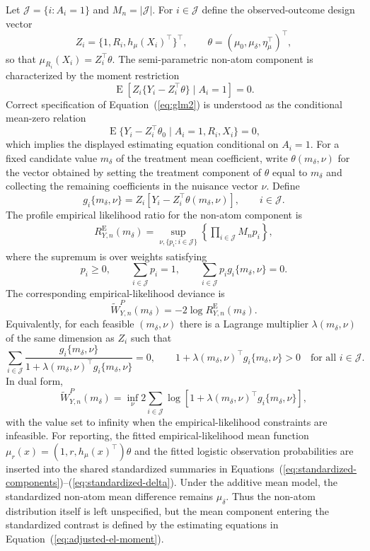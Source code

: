 \documentclass[11pt]{article}
\DeclareMathOperator*{\E}{E}
\begin{document}
Let $\mathcal{J} = \{i : A_i = 1\}$ and $M_n = |\mathcal{J}|$. For $i \in \mathcal{J}$ define the observed-outcome design vector
\[
  Z_i =
  \{1, R_i, h_\mu(X_i)^\top\}^\top,
  \qquad
  \theta =
  (\mu_0,\mu_\delta,\eta_\mu^\top)^\top,
\]
so that $\mu_{R_i}(X_i)=Z_i^\top\theta$. The semi-parametric non-atom component is characterized by the moment restriction
\begin{equation}
  \E\!\left[
    Z_i\{Y_i-Z_i^\top\theta\}
    \mid A_i = 1
  \right] = 0.
  \label{eq:adjusted-el-moment}
\end{equation}
Correct specification of Equation~(\ref{eq:glm2}) is understood as the conditional mean-zero relation
\[
  \E\{Y_i-Z_i^\top\theta_0\mid A_i=1,R_i,X_i\}=0,
\]
which implies the displayed estimating equation conditional on $A_i=1$.
For a fixed candidate value $m_\delta$ of the treatment mean coefficient, write $\theta(m_\delta,\nu)$ for the vector obtained by setting the treatment component of $\theta$ equal to $m_\delta$ and collecting the remaining coefficients in the nuisance vector $\nu$. Define
\[
  g_i\{m_\delta,\nu\}
  =
  Z_i\left[Y_i-Z_i^\top\theta(m_\delta,\nu)\right],
  \qquad i \in \mathcal{J}.
\]
The profile empirical likelihood ratio for the non-atom component is
\begin{align*}
  R_{Y,n}^{\mathrm{E}}(m_\delta)
  =
  \sup_{\nu,\{p_i:i\in\mathcal{J}\}}
  \left\{
    \prod_{i \in \mathcal{J}} M_n p_i
  \right\},
\end{align*}
where the supremum is over weights satisfying
\[
  p_i \geq 0,
  \qquad
  \sum_{i \in \mathcal{J}} p_i = 1,
  \qquad
  \sum_{i \in \mathcal{J}} p_i g_i\{m_\delta,\nu\}=0.
\]
The corresponding empirical-likelihood deviance is
\begin{equation}
  \widetilde{W}_{Y,n}^P(m_\delta)
  =
  -2\log R_{Y,n}^{\mathrm{E}}(m_\delta).
  \label{eq:adjusted-el-profile}
\end{equation}
Equivalently, for each feasible $(m_\delta,\nu)$ there is a Lagrange multiplier $\lambda(m_\delta,\nu)$ of the same dimension as $Z_i$ such that
\[
  \sum_{i \in \mathcal{J}}
  \frac{g_i\{m_\delta,\nu\}}
  {1+\lambda(m_\delta,\nu)^\top g_i\{m_\delta,\nu\}}
  =0,
  \qquad
  1+\lambda(m_\delta,\nu)^\top g_i\{m_\delta,\nu\} > 0
  \quad\text{for all }i\in\mathcal{J}.
\]
In dual form,
\begin{equation*}
  \widetilde{W}_{Y,n}^P(m_\delta)
  =
  \inf_{\nu}
  2\sum_{i \in \mathcal{J}}
  \log\left[
    1+\lambda(m_\delta,\nu)^\top g_i\{m_\delta,\nu\}
  \right],
\end{equation*}
with the value set to infinity when the empirical-likelihood constraints are infeasible. For reporting, the fitted empirical-likelihood mean function $\mu_r(x)=(1,r,h_\mu(x)^\top)\theta$ and the fitted logistic observation probabilities are inserted into the shared standardized summaries in Equations~(\ref{eq:standardized-components})--(\ref{eq:standardized-delta}). Under the additive mean model, the standardized non-atom mean difference remains $\mu_\delta$. Thus the non-atom distribution itself is left unspecified, but the mean component entering the standardized contrast is defined by the estimating equations in Equation~(\ref{eq:adjusted-el-moment}).
\end{document}
